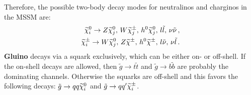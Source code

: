 Therefore, the possible two-body decay modes for neutralinos and charginos in the MSSM are:
\begin{eqnarray}
\label{ChiDecays}
\widetilde{\chi}^0_i \rightarrow Z \widetilde{\chi}^0_j, \, W \widetilde{\chi}^{\pm}_j,\,  h^0\widetilde{\chi}^0_j ,\,l\tilde{l},\,\nu\tilde{\nu} \, ,\\
\widetilde{\chi}^{\pm}_i \rightarrow W \widetilde{\chi}^0_j,\, Z \widetilde{\chi}^{\pm} ,\, h^0\widetilde{\chi}^{\pm},\,l\tilde{\nu},\,\nu\tilde{l} \, .
\end{eqnarray}
\textbf{Gluino} decays via a squark exclusively, which can be either on- or off-shell. If the on-shell decays are allowed, then $\tilde{g} \rightarrow t\tilde{t}$ and $\tilde{g} \rightarrow b\tilde{b}$ are probably the dominating channels. Otherwise the squarks are off-shell and this favors the following decays: $\tilde{g} \rightarrow qq\widetilde{\chi}^0_i$ and $\tilde{g} \rightarrow qq'\widetilde{\chi}^{\pm}_i$.
\\

